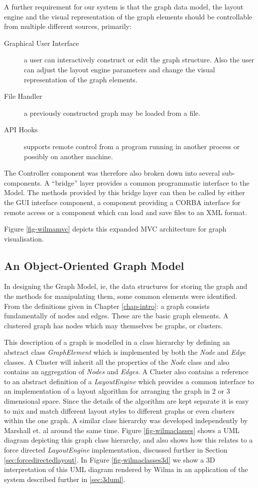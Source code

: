 \documentclass[runningheads]{cl2emult}
\begin{document}
A further requirement for our system is that the graph data model,
the layout engine and the visual representation of the graph elements should be controllable from multiple different sources, primarily:
\begin{description}
\item[Graphical User Interface] a user can interactively construct or edit the graph structure.  Also the user can adjust the layout engine parameters and change the visual representation of the graph elements.
\item[File Handler] a previously constructed graph may be loaded from a file.
\item[API Hooks] supports remote control from a program running in another process or possibly on
another machine. 
\end{description}
The Controller component was therefore also broken
down into several sub-components.  A ``bridge'' layer provides a common
programmatic interface to the Model.  The methods provided by this
bridge layer can then be called by either the GUI interface component,
a component providing a CORBA interface for remote access or a component which
can load and save files to an XML format.

Figure \ref{fig-wilmamvc} depicts this expanded MVC architecture for graph
visualisation. 

\subsection{An Object-Oriented Graph Model}
In designing the Graph Model, ie, the data structures for storing the
graph and the methods for manipulating them, some common
elements were identified.  From the definitions given in Chapter 
\ref{chap-intro}: a graph consists fundamentally
of nodes and edges.  These are the basic graph elements.  A clustered
graph has nodes which may themselves be graphs, or clusters.

This description of a graph is modelled in a class hierarchy by
defining an abstract class {\em GraphElement} which is implemented by
both the {\em Node} and {\em Edge} classes.  A {Cluster} will inherit
all the properties of the {\em Node} class and also contains an
aggregation of {\em Nodes} and {\em Edges}.  A {Cluster} also contains
a reference to an abstract definition of a {\em LayoutEngine} which
provides a common interface to an implementation of a layout algorithm
for arranging the graph in 2 or 3 dimensional space.  Since the
details of the algorithm are kept separate it is easy to mix and match
different layout styles to different graphs or even clusters within
the one graph.  A similar class hierarchy was developed independently
by Marshall et.  al\cite{marshall00object} around the same time.
Figure \ref{fig-wilmaclasses} shows a UML diagram depicting this
graph class hierarchy, and also shows how this relates to a force
directed {\em LayoutEngine} implementation, discussed further in
Section \ref{sec:forcedirectedlayout}.  In Figure
\ref{fig-wilmaclasses3d} we show a 3D
interpretation of this UML diagram rendered by Wilma in an application
of the system described further in \ref{sec:3duml}.
\end{document}
